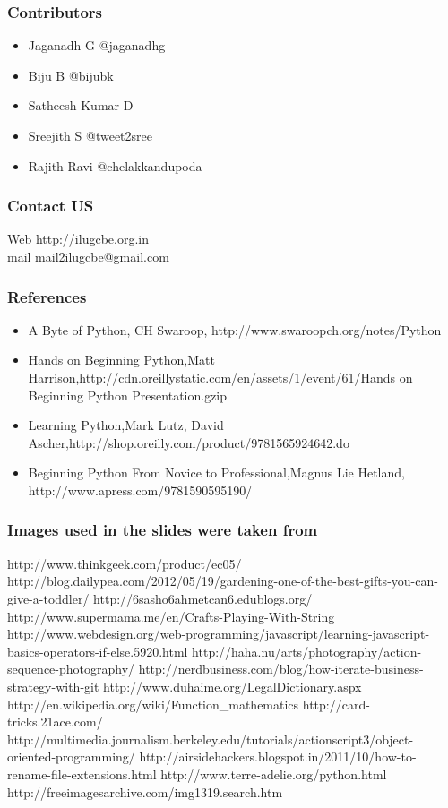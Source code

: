\documentclass{beamer}
\begin{document}
\begin{frame}
 \frametitle{Contributors}
\begin{center}
 \begin{itemize}
  \item Jaganadh G           @jaganadhg
  \item Biju B               @bijubk
  \item Satheesh Kumar D     
  \item Sreejith S           @tweet2sree
  \item Rajith Ravi          @chelakkandupoda
 \end{itemize}

\end{center}

\end{frame}

\begin{frame}
 \frametitle{Contact US}
\begin{block}{Web}
 http://ilugcbe.org.in \\
 mail mail2ilugcbe@gmail.com
\end{block}

\end{frame}

\begin{frame}
 \frametitle{References}
\begin{itemize}
 \item A Byte of Python, CH Swaroop, http://www.swaroopch.org/notes/Python
 \item Hands on Beginning Python,Matt Harrison,http://cdn.oreillystatic.com/en/assets/1/event/61/Hands on Beginning Python Presentation.gzip
 \item Learning Python,Mark Lutz, David Ascher,http://shop.oreilly.com/product/9781565924642.do
 \item Beginning Python From Novice to Professional,Magnus Lie Hetland, http://www.apress.com/9781590595190/
\end{itemize}


\end{frame}


\begin{frame}
 \frametitle{Images used in the slides were taken from }
 http://www.thinkgeek.com/product/ec05/
http://blog.dailypea.com/2012/05/19/gardening-one-of-the-best-gifts-you-can-give-a-toddler/
http://6sasho6ahmetcan6.edublogs.org/
http://www.supermama.me/en/Crafts-Playing-With-String
http://www.webdesign.org/web-programming/javascript/learning-javascript-basics-operators-if-else.5920.html
 http://haha.nu/arts/photography/action-sequence-photography/
http://nerdbusiness.com/blog/how-iterate-business-strategy-with-git
http://www.duhaime.org/LegalDictionary.aspx
 http://en.wikipedia.org/wiki/Function\_mathematics
 http://card-tricks.21ace.com/
http://multimedia.journalism.berkeley.edu/tutorials/actionscript3/object-oriented-programming/
http://airsidehackers.blogspot.in/2011/10/how-to-rename-file-extensions.html
http://www.terre-adelie.org/python.html
http://freeimagesarchive.com/img1319.search.htm
\end{frame}
\end{document}
